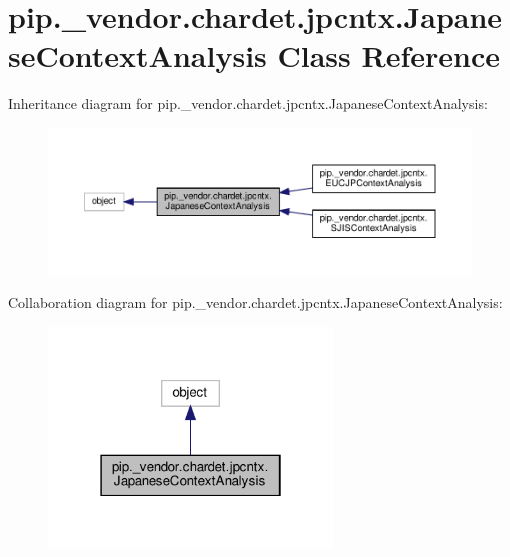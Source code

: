 \hypertarget{classpip_1_1__vendor_1_1chardet_1_1jpcntx_1_1JapaneseContextAnalysis}{}\section{pip.\+\_\+vendor.\+chardet.\+jpcntx.\+Japanese\+Context\+Analysis Class Reference}
\label{classpip_1_1__vendor_1_1chardet_1_1jpcntx_1_1JapaneseContextAnalysis}


Inheritance diagram for pip.\+\_\+vendor.\+chardet.\+jpcntx.\+Japanese\+Context\+Analysis\+:
\nopagebreak
\begin{figure}[H]
\begin{center}
\leavevmode
\includegraphics[width=350pt]{classpip_1_1__vendor_1_1chardet_1_1jpcntx_1_1JapaneseContextAnalysis__inherit__graph}
\end{center}
\end{figure}


Collaboration diagram for pip.\+\_\+vendor.\+chardet.\+jpcntx.\+Japanese\+Context\+Analysis\+:
\nopagebreak
\begin{figure}[H]
\begin{center}
\leavevmode
\includegraphics[width=214pt]{classpip_1_1__vendor_1_1chardet_1_1jpcntx_1_1JapaneseContextAnalysis__coll__graph}
\end{center}
\end{figure}
